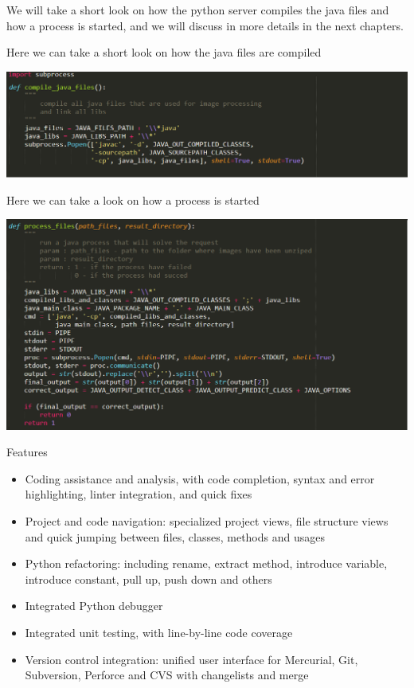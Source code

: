 \documentclass[12pt, a4paper]{report}
\begin{document}
We will take a short look on how the python server compiles the java files and how a process is started, and we will discuss in more details in the next chapters.
\medskip

Here we can take a short look on how the java files are compiled
\par
\medskip
\includegraphics[scale=0.6]{python_call_java_1.png}
\bigskip

Here we can take a look on how a process is started
\par
\medskip
\includegraphics[scale=0.6]{python_call_java_2.png}



{\Large Features\par}

\begin{itemize}
  \item Coding assistance and analysis, with code completion, syntax and error highlighting, linter integration, and quick fixes
  \item Project and code navigation: specialized project views, file structure views and quick jumping between files, classes, methods and usages
  \item Python refactoring: including rename, extract method, introduce variable, introduce constant, pull up, push down and others
  \item Integrated Python debugger
  \item Integrated unit testing, with line-by-line code coverage
  \item Version control integration: unified user interface for Mercurial, Git, Subversion, Perforce and CVS with changelists and merge
\end{itemize}
\end{document}

